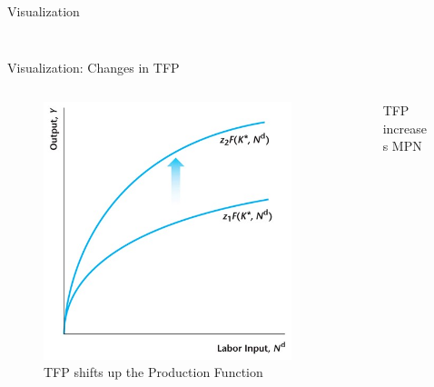 \documentclass[11pt,aspectratio=43]{beamer}
\theoremstyle{definition}
\begin{document}
\begin{frame}{Visualization}
\begin{columns}
\begin{column}{0.5\textwidth}
\begin{figure}
        \end{figure}
    \end{column}
\end{columns}
\end{frame}

\begin{frame}{Visualization: Changes in TFP}
\label{slide:Visualization__Changes_in_TFP}
\begin{columns}
    \begin{column}{0.5\textwidth}
        \begin{figure}
            \caption{TFP shifts up the Production Function}
            \includegraphics[width=\textwidth]{./figures/Figure4_16.jpg}
        \end{figure}
    \end{column}
    \begin{column}{0.5\textwidth}
        \begin{figure}
            \caption{TFP increases MPN}

\end{figure}
\end{column}
\end{columns}
\end{frame}
\end{document}
